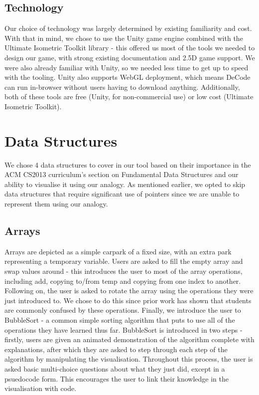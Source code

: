 \documentclass[11pt]{article}
\begin{document}
\subsection{Technology}
Our choice of technology was largely determined by existing familiarity and cost. With that in mind, we chose to use the Unity game engine\cite{technologies} combined with the Ultimate Isometric Toolkit\cite{isometricToolkit} library - this offered us most of the tools we needed to design our game, with strong existing documentation and 2.5D game support. We were also already familiar with Unity, so we needed less time to get up to speed with the tooling. Unity also supports WebGL deployment, which means DeCode can run in-browser without users having to download anything. Additionally, both of these tools are free (Unity, for non-commercial use) or low cost (Ultimate Isometric Toolkit).\par
\section{Data Structures}
We chose 4 data structures to cover in our tool based on their importance in the ACM CS2013 curriculum's section on Fundamental Data Structures\cite{CS2013} and our ability to visualise it using our analogy. As mentioned earlier, we opted to skip data structures that require significant use of pointers since we are unable to represent them using our analogy.
\subsection{Arrays}
Arrays are depicted as a simple carpark of a fixed size, with an extra park representing a temporary variable. Users are asked to fill the empty array and swap values around - this introduces the user to most of the array operations, including add, copying to/from temp and copying from one index to another. Following on, the user is asked to rotate the array using the operations they were just introduced to. We chose to do this since prior work\cite{izuloop} has shown that students are commonly confused by these operations. Finally, we introduce the user to BubbleSort - a common simple sorting algorithm that puts to use all of the operations they have learned thus far. BubbleSort is introduced in two steps - firstly, users are given an animated demonstration of the algorithm complete with explanations, after which they are asked to step through each step of the algorithm by manipulating the visualisation. Throughout this process, the user is asked basic multi-choice questions about what they just did, except in a psuedocode form. This encourages the user to link their knowledge in the visualisation with code.
\end{document}
